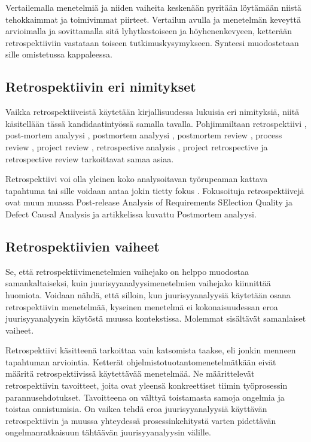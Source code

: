 Vertailemalla menetelmiä ja niiden vaiheita keskenään pyritään löytämään niistä tehokkaimmat ja toimivimmat piirteet. 
Vertailun avulla ja menetelmän keveyttä arvioimalla ja sovittamalla sitä lyhytkestoiseen ja höyhenenkevyeen, ketterään retrospektiiviin vastataan toiseen tutkimuskysymykseen. Synteesi muodostetaan sille omistetussa kappaleessa. 

\subsection{Retrospektiivin eri nimitykset}
Vaikka retrospektiiveistä käytetään kirjallisuudessa lukuisia eri nimityksiä, niitä käsitellään tässä kandidaatintyössä samalla tavalla. Pohjimmiltaan retrospektiivi \citep{AgileRetros2006}, post-mortem analyysi \citep{staalhane2003post}, postmortem analyysi \citep{de2004learning}, postmortem review \citep{dingsoyr2003extending}, process review \citep{karlsson2006case}, project review \citep{karlsson2006case}, retrospective analysis \citep{karlsson2006case}, project retrospective \citep{karlsson2006case} ja retrospective review \citep{karlsson2006case} tarkoittavat samaa asiaa.

Retrospektiivi voi olla yleinen koko analysoitavan työrupeaman kattava tapahtuma tai sille voidaan antaa jokin tietty fokus \citep{staalhane2003post}. Fokusoituja retrospektiivejä ovat muun muassa Post-release Analysis of Requirements SElection Quality \citep{karlsson2006case} ja Defect Causal Analysis \citep{card1998learning} ja artikkelissa \citep{de2004learning} kuvattu Postmortem analyysi.

\subsection{Retrospektiivien vaiheet}
Se, että retrospektiivimenetelmien vaihejako on helppo muodostaa samankaltaiseksi, kuin juurisyyanalyysimenetelmien vaihejako \citep{Lehtinen2011} kiinnittää huomiota. Voidaan nähdä, että silloin, kun juurisyyanalyysiä käytetään osana retrospektiivin menetelmää, kyseinen menetelmä ei kokonaisuudessan eroa juurisyyanalyysin käytöstä muussa kontekstissa. Molemmat sisältävät samanlaiset vaiheet.

Retrospektiivi käsitteenä tarkoittaa vain katsomista taakse, eli jonkin menneen tapahtuman arviointia. Ketterät ohjelmistotuotantomenetelmätkään eivät määritä retrospektiivissä käytettävää menetelmää. Ne määrittelevät retrospektiivin tavoitteet, joita ovat yleensä konkreettiset tiimin työprosessin parannusehdotukset. Tavoitteena on välttyä toistamasta samoja ongelmia ja toistaa onnistumisia. On vaikea tehdä eroa juurisyyanalyysiä käyttävän retrospektiivin ja muussa yhteydessä prosessinkehitystä varten pidettävän ongelmanratkaisuun tähtäävän juurisyyanalyysin välille.

